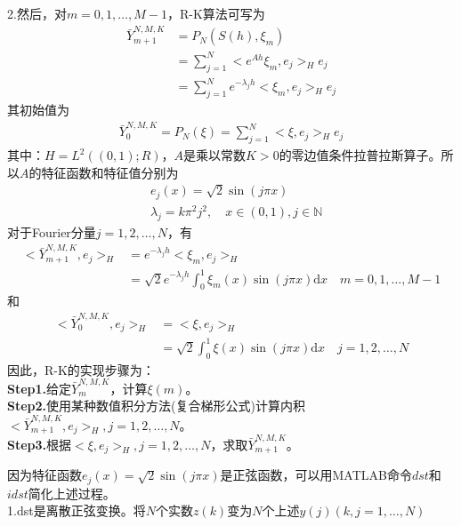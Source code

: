             2.然后，对$m = 0,1,\dots,M-1$，R-K算法可写为
            \begin{align*}
            \bar{Y}_{m+1}^{N,M,K} &= P_N(S(h),\xi_m) \\
            &= \sum_{j=1}^N\bigl<e^{Ah}\xi _m,e_j\bigr>_He_j \\
            &= \sum_{j=1}^N e^{-\lambda _j h} \bigl< \xi_m,e_j \bigr>_H e_j
            \end{align*}
            其初始值为
            \begin{align*}
                \bar{Y}_{0}^{N,M,K} = P_N(\xi) = \sum_{j=1}^N\bigl<\xi ,e_j\bigr>_He_j
            \end{align*}
            其中：$H = L^2((0,1);R)$，$A$是乘以常数$K>0$的零边值条件拉普拉斯算子。所以$A$的特征函数和特征值分别为
            \begin{align*}
                &e_j(x) = \sqrt{2}\sin(j\pi x)\\
                &\lambda_j = k \pi^2 j^2,\quad x\in(0,1),j\in\mathbb{N}
            \end{align*}
            对于Fourier分量$j = 1,2,\dots,N$，有
            \begin{align*}
                \bigl< \bar{Y}_{m+1}^{N,M,K} ,e_j\bigr>_H &= e^{-\lambda _j h} \bigl< \xi_m,e_j \bigr>_H\\
                &=\sqrt{2}e^{-\lambda _j h} \int_0^1\xi_m(x) \sin(j\pi x)\mathrm{d}x \quad m = 0,1,\dots,M-1
            \end{align*}
            和
            \begin{align*}
                \bigl< \bar{Y}_{0}^{N,M,K} ,e_j\bigr>_H &= \bigl< \xi,e_j \bigr>_H\\
                &=\sqrt{2} \int_0^1 \xi(x) \sin (j\pi x)\mathrm{d}x \quad j = 1,2,\dots,N
            \end{align*}
            因此，R-K的实现步骤为：\\
            \textbf{Step1.}给定$\bar{Y}_{m}^{N,M,K}$，计算$\xi(m)$。\\
            \textbf{Step2.}使用某种数值积分方法(复合梯形公式)计算内积$\bigl< \bar{Y}_{m+1}^{N,M,K} ,e_j\bigr>_H,j = 1,2,\dots,N$。\\
            \textbf{Step3.}根据$\bigl< \xi,e_j \bigr>_H,j = 1,2,\dots,N$，求取$\bar{Y}_{m+1}^{N,M,K}$。
            \par
            因为特征函数$e_j(x) = \sqrt{2}\sin(j\pi x)$是正弦函数，可以用MATLAB命令$dst$和$idst$简化上述过程。\\
            1.dst是离散正弦变换。将$N$个实数$z(k)$变为$N$个上述$y(j)(k,j = 1,\dots,N)$
